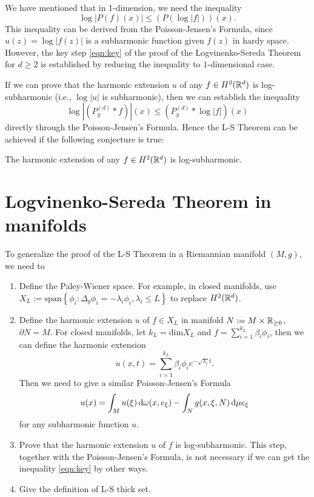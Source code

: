 We have mentioned that in 1-dimension, we need the inequality 
\begin{equation}\label{eqn:key}
\log |P(f)(x)|\le \left( P\left( \log|f| \right)  \right) (x).
\end{equation}
This inequality can be derived from the Poisson-Jensen's Formula, since $u(z)=\log |f(z)|$ is a subharmonic function given $f(z)$ in hardy space. However, the key step \cref{eqn:key} of the proof of the Logvinenko-Sereda Theorem for $d\ge 2$ is established by reducing the inequality to $1$-dimensional case.

If we can prove that the harmonic extension $u$ of any $f \in H^2(\mathbb{R}^{d})$ is log-subharmonic (i.e., $\log|u|$ is subharmonic), then we can establish the inequality
\[
\log|\left(P_y^{(d)}*f\right)|(x)\le \left( P_y^{(d)}*\log|f| \right) (x)
\] 
directly through the Poisson-Jensen's Formula. Hence the L-S Theorem can be achieved if the following conjecture is true:

\begin{conjecture}
	The harmonic extension of any $f\in H^2(\mathbb{R}^{d})$ is log-subharmonic.
\end{conjecture}


\section{Logvinenko-Sereda Theorem in manifolds}

To generalize the proof of the L-S Theorem in a Riemannian manifold $(M,g)$, we need to 
\begin{enumerate}
	\item Define the Paley-Wiener space. For example, in closed manifolds, use  $X_L:= \mathrm{span}\left\{\phi_i:\Delta_g \phi_i=-\lambda_i \phi_i,\lambda_i \le L\right\} $ to replace $H^2(\mathbb{R}^{d})$.
	\item Define the harmonic extension $u$ of $f\in  X_L$ in manifold $N:=M\times \mathbb{R}_{\ge 0}$, $\partial N=M$. For closed manifolds, let $k_L=\mathrm{dim}X_L$ and $f=\sum_{i=1}^{k_L} \beta_i \phi_i$, then we can define the harmonic extension
		\begin{equation}
			u(x,t)= \sum_{i=1}^{k_L} \beta_i\phi_i e^{-\sqrt{\lambda_i} t}.
		\end{equation}
	Then we need to give a similar Poisson-Jensen's Formula
		\begin{equation}
			u(x)=\int_{M} u(\xi)\,\mathrm{d} \omega(x,e_{\xi})-\int_{N}g(x,\xi,N)\,\mathrm{d}\mu e_{\xi}
		\end{equation}
		for any subharmonic function $u$.
	\item Prove that the harmonic extension $u$ of $f$ is log-subharmonic. This step, together with the Poisson-Jensen's Formula, is not necessary if we can get the inequality \cref{eqn:key} by other ways.
	\item Give the definition of L-S thick set.
\end{enumerate}


